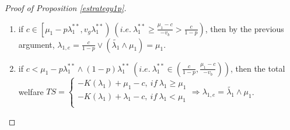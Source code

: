 \documentclass[11pt]{extarticle}
\newcommand{\ra}{\Rightarrow}
\newcommand{\m}{\wedge}
\newcommand{\M}{\vee}
\begin{document}
\begin{proof}[Proof of Proposition \ref{estrategy1p}]
\begin{enumerate}
		\item if $c \in \left[\mu_1-p\lambda_1^{**},v_g\lambda_1^{**} \right)~(i.e.~ \lambda_1^{**} \geq \frac{\mu_1-c}{-v_b} > \frac{c}{1-p})$, then by the previous argument, $\lambda_{1,e} = \frac{c}{1-p}\M(\tilde{\lambda_1} \m \mu_1) = \mu_1$.
		
		\item if $c < \mu_1-p\lambda_1^{**} \m (1-p) \lambda_1^{**} ~(i.e.~ \lambda_1^{**} \in \left(\frac{c}{1-p}, \frac{\mu_1-c}{-v_b}\right))$, then the total welfare $TS =  \begin{cases}
		-K(\lambda_1)+\mu_1-c,~if~\lambda_1\geq \mu_1\\
		-K(\lambda_1)+\lambda_1-c,~if~\lambda_1< \mu_1\\
		\end{cases}\ra \lambda_{1,e} = \tilde{\lambda_1} \m \mu_1$.
	\end{enumerate}
\end{proof}
\end{document}
